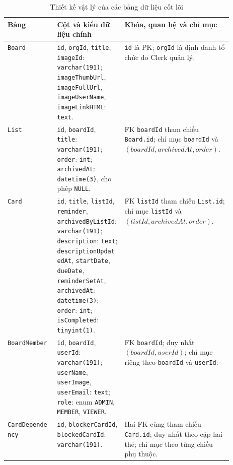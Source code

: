 \documentclass[../DoAn.tex]{subfiles}
\begin{document}
\begin{table}[H]
    \centering
    \footnotesize
    \setlength{\tabcolsep}{3pt}
    \caption{Thiết kế vật lý của các bảng dữ liệu cốt lõi}
    \label{table:chapter4_physical_schema}
    \begin{tabularx}{\linewidth}{|>{\raggedright\arraybackslash}p{0.22\linewidth}|>{\raggedright\arraybackslash}p{0.30\linewidth}|>{\raggedright\arraybackslash}X|}
        \hline
        \textbf{Bảng} & \textbf{Cột và kiểu dữ liệu chính} & \textbf{Khóa, quan hệ và chỉ mục} \\ \hline
        \texttt{Board} & \texttt{id}, \texttt{orgId}, \texttt{title}, \texttt{imageId}: \texttt{varchar(191)}; \texttt{imageThumbUrl}, \texttt{imageFullUrl}, \texttt{imageUserName}, \texttt{imageLinkHTML}: \texttt{text}. & \texttt{id} là PK; \texttt{orgId} là định danh tổ chức do Clerk quản lý. \\ \hline
        \texttt{List} & \texttt{id}, \texttt{boardId}, \texttt{title}: \texttt{varchar(191)}; \texttt{order}: \texttt{int}; \texttt{archivedAt}: \texttt{datetime(3)}, cho phép \texttt{NULL}. & FK \texttt{boardId} tham chiếu \texttt{Board.id}; chỉ mục \texttt{boardId} và \((boardId, archivedAt, order)\). \\ \hline
        \texttt{Card} & \texttt{id}, \texttt{title}, \texttt{listId}, \texttt{reminder}, \texttt{archivedByListId}: \texttt{varchar(191)}; \texttt{description}: \texttt{text}; \texttt{descriptionUpdatedAt}, \texttt{startDate}, \texttt{dueDate}, \texttt{reminderSetAt}, \texttt{archivedAt}: \texttt{datetime(3)}; \texttt{order}: \texttt{int}; \texttt{isCompleted}: \texttt{tinyint(1)}. & FK \texttt{listId} tham chiếu \texttt{List.id}; chỉ mục \texttt{listId} và \((listId, archivedAt, order)\). \\ \hline
        \texttt{BoardMember} & \texttt{id}, \texttt{boardId}, \texttt{userId}: \texttt{varchar(191)}; \texttt{userName}, \texttt{userImage}, \texttt{userEmail}: \texttt{text}; \texttt{role}: enum \texttt{ADMIN}, \texttt{MEMBER}, \texttt{VIEWER}. & FK \texttt{boardId}; duy nhất \((boardId,userId)\); chỉ mục riêng theo \texttt{boardId} và \texttt{userId}. \\ \hline
        \texttt{CardDependency} & \texttt{id}, \texttt{blockerCardId}, \texttt{blockedCardId}: \texttt{varchar(191)}. & Hai FK cùng tham chiếu \texttt{Card.id}; duy nhất theo cặp hai thẻ; chỉ mục theo từng chiều phụ thuộc. \\ \hline
    \end{tabularx}
\end{table}
\end{document}
